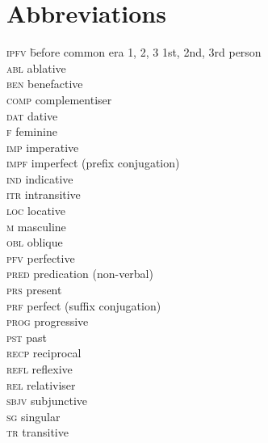 \documentclass[output=paper]{langsci/langscibook}
\begin{document}
\section*{Abbreviations}
\begin{multicols}{2}
\begin{tabbing}
\textsc{ipfv} \hspace{1em} \= before common era\kill
\textsc{1, 2, 3} \> 1st, 2nd, 3rd person \\
\textsc{abl} \> ablative \\
\textsc{ben} \> benefactive \\
\textsc{comp} \> complementiser \\
\textsc{dat} \> dative \\
\textsc{f} \> feminine \\
\textsc{imp} \> imperative \\
\textsc{impf} \> imperfect (prefix conjugation) \\
\textsc{ind} \> indicative \\
\textsc{itr} \> intransitive \\
\textsc{loc} \> locative \\
\textsc{m} \> masculine \\
\textsc{obl} \> oblique \\
\textsc{pfv} \> perfective \\
\textsc{pred} \> predication (non-verbal) \\
\textsc{prs} \> present \\
\textsc{prf} \> perfect (suffix conjugation) \\
\textsc{prog} \> progressive \\
\textsc{pst} \> past \\
\textsc{recp} \> reciprocal \\
\textsc{refl} \> reflexive \\
\textsc{rel} \> relativiser \\
\textsc{sbjv} \> subjunctive \\
\textsc{sg} \> singular \\
\textsc{tr} \> transitive \\
\end{tabbing}
\end{multicols}


\sloppy
\printbibliography[heading=subbibliography,notkeyword=this] 
\end{document}
